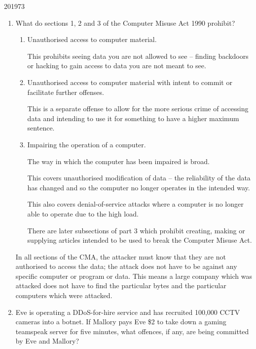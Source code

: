 \documentclass[10pt,\jkfside,a4paper]{article}
\begin{document}
\begin{examquestion}{2019}{7}{3}

\begin{enumerate}[label=(\alph*)]

\item What do sections 1, 2 and 3 of the Computer Misuse Act 1990 prohibit?

\begin{enumerate}[label=Section \arabic*. ]

\item Unauthorised access to computer material.

This prohibits seeing data you are not allowed to see -- finding backdoors
or hacking to gain access to data you are not meant to see.

\item Unauthorised access to computer material with intent to commit or
facilitate further offenses.

This is a separate offense to allow for the more serious crime of accessing
data and intending to use it for something to have a higher maximum sentence.

\item Impairing the operation of a computer.

The way in which the computer has been impaired is broad.

This covers unauthorised modification of data -- the reliability of the
data has changed and so the computer no longer operates in the intended way.

This also covers denial-of-service attacks where a computer is no longer
able to operate due to the high load.

There are later subsections of part 3 which prohibit creating, making or
supplying articles intended to be used to break the Computer Misuse Act.

\end{enumerate}

In all sections of the CMA, the attacker must know that they are not
authorised to access the data; the attack does not have to be against any
specific computer or program or data. This means a large company which was
attacked does not have to find the particular bytes and the particular
computers which were attacked.

\item Eve is operating a DDoS-for-hire service and has recruited 100,000
CCTV cameras into a botnet. If Mallory pays Eve \$2 to take down a gaming
teamspeak server for five minutes, what offences, if any, are being
committed by Eve and Mallory?


\end{enumerate}
\end{examquestion}
\end{document}
